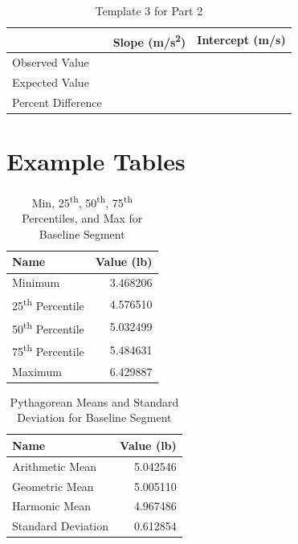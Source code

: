 \begin{table}[ht!]
    \begin{center}
        \begin{tabular}{l | l | l}
            & \textbf{Slope} (m/s\textsuperscript{2}) & \textbf{Intercept} (m/s) \\
            \hline
            Observed Value & & \\
            Expected Value & & \\
            \hline
            Percent Difference & & \\
            \hline
        \end{tabular}
    \end{center}
    \caption{Template 3 for Part 2}
    \label{table.00.template.3}
\end{table}
%
\newpage
\section{Example Tables}
%
\begin{table}[ht]
    \centering
    \begin{tabular}{l|r}
        \textbf{Name} & \textbf{Value} (lb) \\
        \hline
		Minimum & 3.468206 \\
		25\textsuperscript{th} Percentile & 4.576510 \\
		50\textsuperscript{th} Percentile & 5.032499 \\
		75\textsuperscript{th} Percentile & 5.484631 \\
		Maximum & 6.429887 \\
		\hline
	\end{tabular}
    \caption{Min, 25\textsuperscript{th}, 50\textsuperscript{th}, 75\textsuperscript{th} Percentiles, and Max for Baseline Segment}
    \label{table:00.baseline.descriptive}
\end{table}
%
\begin{table}[ht]
    \centering
    \begin{tabular}{l|r}
		\textbf{Name} & \textbf{Value} (lb) \\
        \hline
		Arithmetic Mean & 5.042546 \\
		Geometric Mean & 5.005110 \\
        Harmonic Mean & 4.967486 \\
        \hline
        Standard Deviation & 0.612854 \\
		\hline
	\end{tabular}
    \caption{Pythagorean Means and Standard Deviation for Baseline Segment}
    \label{table:00.baseline.means}
\end{table}
